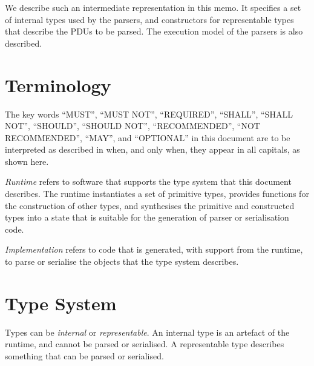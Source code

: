 \documentclass[10pt,twocolumn,a4paper]{article}
\begin{document}
We describe such an intermediate representation in this memo.
It specifies a set of internal types used by the parsers, and constructors
for representable types that describe the PDUs to be parsed.
The execution model of the parsers is also described.






\section{Terminology}

The key words ``MUST'', ``MUST NOT'', ``REQUIRED'', ``SHALL'', ``SHALL
NOT'', ``SHOULD'', ``SHOULD NOT'', ``RECOMMENDED'', ``NOT RECOMMENDED'',
``MAY'', and ``OPTIONAL'' in this document are to be interpreted as
described in \cite{RFC2119,RFC8174} when, and only when, they appear
in all capitals, as shown here.

\emph{Runtime} refers to software that supports the type system that this
document describes. The runtime instantiates a set of primitive types, provides
functions for the construction of other types, and synthesises the primitive and
constructed types into a state that is suitable for the generation of parser or
serialisation code.

\emph{Implementation} refers to code that is generated, with support from the
runtime, to parse or serialise the objects that the type system describes.

\section{Type System}

Types can be \emph{internal} or \emph{representable}. An internal type is an
artefact of the runtime, and cannot be parsed or serialised. A representable
type describes something that can be parsed or serialised.
\end{document}
